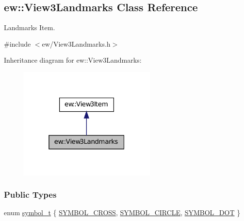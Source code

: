 \hypertarget{classew_1_1View3Landmarks}{
\subsection{ew::View3Landmarks Class Reference}
\label{classew_1_1View3Landmarks}
}


Landmarks Item.  




{\ttfamily \#include $<$ew/View3Landmarks.h$>$}



Inheritance diagram for ew::View3Landmarks:
\nopagebreak
\begin{figure}[H]
\begin{center}
\leavevmode
\includegraphics[width=196pt]{classew_1_1View3Landmarks__inherit__graph}
\end{center}
\end{figure}
\subsubsection*{Public Types}
\begin{DoxyCompactItemize}
\item 
enum \hyperlink{classew_1_1View3Landmarks_a1568c52b9714e8042cfdc7a1835413c4}{symbol\_\-t} \{ \hyperlink{classew_1_1View3Landmarks_a1568c52b9714e8042cfdc7a1835413c4a0844a595f6fe10dff5493050cbc31a2c}{SYMBOL\_\-CROSS}, 
\hyperlink{classew_1_1View3Landmarks_a1568c52b9714e8042cfdc7a1835413c4a1f2350f74b86929d03442b7c7fccbf88}{SYMBOL\_\-CIRCLE}, 
\hyperlink{classew_1_1View3Landmarks_a1568c52b9714e8042cfdc7a1835413c4ae45cc6c7d43c3c5924d55612b3c193e8}{SYMBOL\_\-DOT}
 \}
\end{DoxyCompactItemize}
